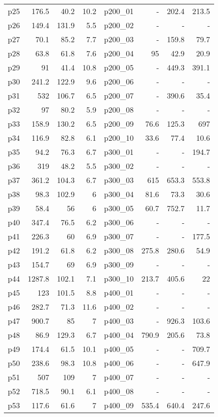 \begin{tabular}{ | l | r | r | r || l | r | r | r | }
p25	&176.5	&40.2	&10.2	&p200\_01	&-	&202.4	&213.5\\
p26	&149.4	&131.9	&5.5	&p200\_02	&-	&-	&-\\
p27	&70.1	&85.2	&7.7	&p200\_03	&-	&159.8	&79.7\\
p28	&63.8	&61.8	&7.6	&p200\_04	&95	&42.9	&20.9\\
p29	&91	&41.4	&10.8	&p200\_05	&-	&449.3	&391.1\\
p30	&241.2	&122.9	&9.6	&p200\_06	&-	&-	&-\\
p31	&532	&106.7	&6.5	&p200\_07	&-	&390.6	&35.4\\
p32	&97	&80.2	&5.9	&p200\_08	&-	&-	&-\\
p33	&158.9	&130.2	&6.5	&p200\_09	&76.6	&125.3	&697\\
p34	&116.9	&82.8	&6.1	&p200\_10	&33.6	&77.4	&10.6\\
p35	&94.2	&76.3	&6.7	&p300\_01	&-	&-	&194.7\\
p36	&319	&48.2	&5.5	&p300\_02	&-	&-	&-\\
p37	&361.2	&104.3	&6.7	&p300\_03	&615	&653.3	&553.8\\
p38	&98.3	&102.9	&6	&p300\_04	&81.6	&73.3	&30.6\\
p39	&58.4	&56	&6	&p300\_05	&60.7	&752.7	&11.7\\
p40	&347.4	&76.5	&6.2	&p300\_06	&-	&-	&-\\
p41	&226.3	&60	&6.9	&p300\_07	&-	&-	&177.5\\
p42	&191.2	&61.8	&6.2	&p300\_08	&275.8	&280.6	&54.9\\
p43	&154.7	&69	&6.9	&p300\_09	&-	&-	&-\\
p44	&1287.8	&102.1	&7.1	&p300\_10	&213.7	&405.6	&22\\
p45	&123	&101.5	&8.8	&p400\_01	&-	&-	&-\\
p46	&282.7	&71.3	&11.6	&p400\_02	&-	&-	&-\\
p47	&900.7	&85	&7	&p400\_03	&-	&926.3	&103.6\\
p48	&86.9	&129.3	&6.7	&p400\_04	&790.9	&205.6	&73.8\\
p49	&174.4	&61.5	&10.1	&p400\_05	&-	&-	&709.7\\
p50	&238.6	&98.3	&10.8	&p400\_06	&-	&-	&647.9\\
p51	&507	&109	&7	&p400\_07	&-	&-	&-\\
p52	&718.5	&90.1	&6.1	&p400\_08	&-	&-	&-\\
p53	&117.6	&61.6	&7	&p400\_09	&535.4	&640.4	&247.6\\
  \hline  
\end{tabular}

